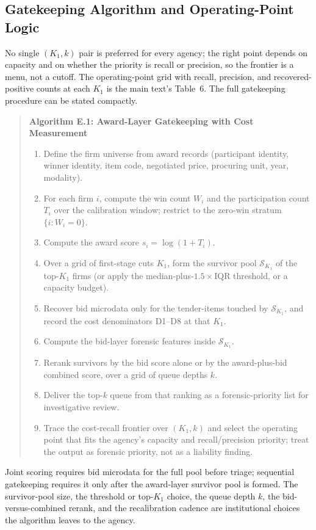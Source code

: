 \subsection{Gatekeeping Algorithm and Operating-Point Logic}
\label{app:algorithm_submission}

No single $(K_1,k)$ pair is preferred for every agency; the right point
depends on capacity and on whether the priority is recall or precision,
so the frontier is a menu, not a cutoff. The operating-point grid with
recall, precision, and recovered-positive counts at each $K_1$ is the
main text's Table~6. The full gatekeeping procedure can be stated
compactly.

\begin{quote}
\textbf{Algorithm E.1: Award-Layer Gatekeeping with Cost Measurement}
\begin{enumerate}
\item Define the firm universe from award records (participant identity,
winner identity, item code, negotiated price, procuring unit, year,
modality).
\item For each firm $i$, compute the win count $W_i$ and the
participation count $T_i$ over the calibration window; restrict to the
zero-win stratum $\{i : W_i = 0\}$.
\item Compute the award score $s_i = \log(1+T_i)$.
\item Over a grid of first-stage cuts $K_1$, form the survivor pool
$\mathcal{S}_{K_1}$ of the top-$K_1$ firms (or apply the
median-plus-$1.5\times$IQR threshold, or a capacity budget).
\item Recover bid microdata only for the tender-items touched by
$\mathcal{S}_{K_1}$, and record the cost denominators D1--D8 at that
$K_1$.
\item Compute the bid-layer forensic features inside $\mathcal{S}_{K_1}$.
\item Rerank survivors by the bid score alone or by the award-plus-bid
combined score, over a grid of queue depths $k$.
\item Deliver the top-$k$ queue from that ranking as a forensic-priority
list for investigative review.
\item Trace the cost-recall frontier over $(K_1,k)$ and select the
operating point that fits the agency's capacity and recall/precision
priority; treat the output as forensic priority, not as a liability
finding.
\end{enumerate}
\end{quote}

Joint scoring requires bid microdata for the full pool before triage;
sequential gatekeeping requires it only after the award-layer survivor
pool is formed. The survivor-pool size, the threshold or top-$K_1$ choice,
the queue depth $k$, the bid-versus-combined rerank, and the
recalibration cadence are institutional choices the algorithm leaves to
the agency.
